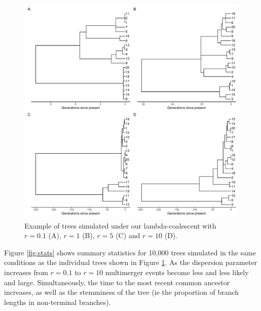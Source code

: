 \documentclass{article}
\begin{document}
\begin{figure}[!p]
\begin{center}
\includegraphics[width=15cm]{../run/figureTree.pdf}
\end{center}
\caption{Example of trees simulated under our lambda-coalescent with $r=0.1$ (A),
$r=1$ (B), $r=5$ (C) and $r=10$ (D).
\label{fig:trees}}
\end{figure}

Figure \ref{fig:stats} shows summary statistics for 10,000 trees simulated in the same conditions
as the individual trees shown in Figure \ref{fig:trees}. 
As the dispersion parameter increases from $r=0.1$
to $r=10$ multimerger events become less and less likely and large. Simultaneously, the
time to the most recent common ancestor increases, as well as the stemminess of the tree 
(ie the proportion of branch lengths in non-terminal branches).
\end{document}
